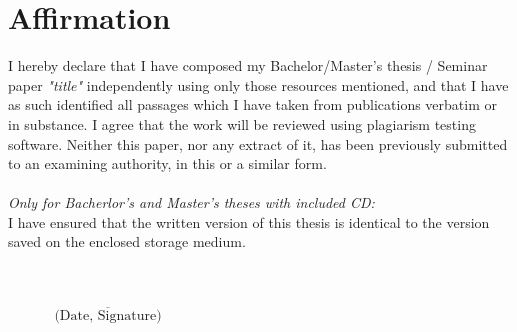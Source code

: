 \documentclass[11pt,a4paper]{article}
\begin{document}
\section*{Affirmation}
I hereby declare that I have composed my Bachelor/Master's thesis / Seminar paper 
\textit{"title"} independently using only those resources mentioned, 
and that I have as such identified all passages which I have 
taken from publications verbatim or in substance. I agree that the work will be reviewed using plagiarism testing software.
Neither 
this paper, nor any extract of it, has been previously 
submitted to an examining authority, in this or a similar 
form.\\ \\
\textit{Only for Bacherlor’s and Master’s theses with included CD:}\\
I have ensured that the written version of this thesis is 
identical to the version saved on the enclosed storage 
medium. \\\\\\


\begin{flushright}
$\overline{~~~~~~~~~~~~~~~\mbox{(Date, Signature)}~~~~~~~~~~~~~~~}$
\end{flushright}
\end{document}

